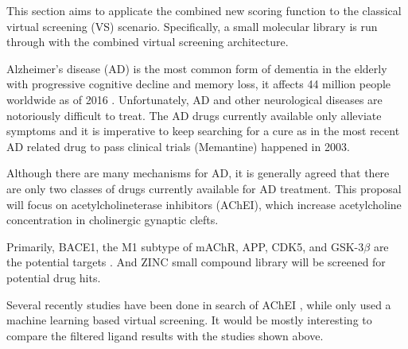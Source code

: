 This section aims to applicate the combined new scoring function to the classical virtual screening (VS) scenario.
Specifically, a small molecular library is run through with the combined virtual screening architecture.

Alzheimer’s disease (AD) is the most common form of dementia in the elderly with progressive cognitive decline and memory loss, 
it affects 44 million people worldwide as of 2016 \cite{winblad2016defeating}.
Unfortunately, AD and other neurological diseases are notoriously difficult to treat. 
The AD drugs currently available only alleviate symptoms\cite{schneider2011lack} and it is imperative to keep searching for a cure as in the most recent AD related drug to pass clinical trials (Memantine) happened in 2003.

Although there are many mechanisms for AD, it is generally agreed that there are only two classes of drugs currently available for AD treatment. 
This proposal will focus on acetylcholineterase inhibitors (AChEI), which increase acetylcholine concentration in cholinergic gynaptic clefts.

Primarily, BACE1, the M1 subtype of mAChR, APP, CDK5, and GSK-3$\beta$ are the potential targets \cite{Carpenter2018}.
And ZINC \cite{irwin2005zinc}  small compound library will be screened for potential drug hits.

Several recently studies have been done in search of AChEI \cite{fang2015discovery,chen2015discovery,kumar2017physicochemical,xie2017designing,ma2010silico}, while only \cite{fang2015discovery} used a machine learning based virtual screening. It would be mostly interesting to compare the filtered ligand results with the studies shown above.


